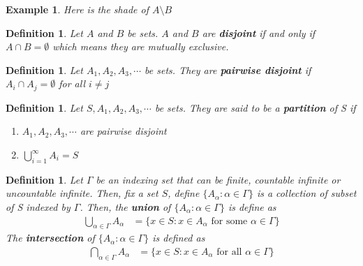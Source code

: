 \documentclass[11pt,oneside]{book}
\theoremstyle{newStyle}
\newtheorem{defn}[thm]{Definition}
\newtheorem{ex}{Example}[section]
\begin{document}
\begin{ex}
Here is the shade of $A\setminus B$ \begin{center}
\end{center}
\end{ex}
\begin{defn}
Let $A$ and $B$ be sets. $A$ and $B$ are \textbf{disjoint} if and only if $A\cap B=\emptyset$ which means they are mutually exclusive.
\end{defn}
\begin{defn}
Let $A_1,A_2,A_3,\cdots$ be sets. They are \textbf{pairwise disjoint} if $A_i\cap A_j=\emptyset$ for all $i\neq j$
\end{defn}
\begin{defn}
Let $S,A_1,A_2,A_3,\cdots$ be sets.
They are said to be a \textbf{partition} of S if \begin{enumerate}[itemsep=0pt, topsep=1pt, partopsep=0pt,label=(\alph*)]
\item $A_1,A_2,A_3,\cdots$ are pairwise disjoint
\item $\bigcup_{i=1}^{\infty}A_i=S$
\end{enumerate}
\end{defn}
\begin{defn}
Let $\Gamma$ be an indexing set that can be finite, countable infinite or uncountable infinite. Then, fix a set $S$, define $\{A_{\alpha}:\alpha \in \Gamma\}$  is a collection of subset of S indexed by $\Gamma$. Then, the \textbf{union} of $\{A_{\alpha}:\alpha \in \Gamma\}$ is define as \begin{align*}
\bigcup_{\alpha \in \Gamma}A_{\alpha}&=\{x\in S: x\in A_{\alpha} \text{ for some }\alpha \in \Gamma\}
\end{align*}
The \textbf{intersection} of $\{A_{\alpha}:\alpha \in \Gamma\}$  is defined as \begin{align*}
\bigcap_{\alpha \in \Gamma}A_{\alpha}&=\{x\in S: x\in A_{\alpha} \text{ for all }\alpha \in \Gamma\}
\end{align*}
\end{defn}
\end{document}
